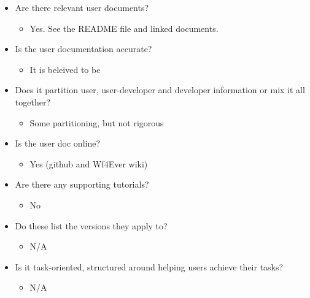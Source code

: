 \begin{itemize}
\itemsep1pt\parskip0pt
\item
  Are there relevant user documents?

  \begin{itemize}
  \itemsep1pt\parskip0pt
  \item
    Yes. See the README file and linked documents.
  \end{itemize}
\item
  Is the user documentation accurate?

  \begin{itemize}
  \itemsep1pt\parskip0pt
  \item
    It is beleived to be
  \end{itemize}
\item
  Does it partition user, user-developer and developer information or
  mix it all together?

  \begin{itemize}
  \itemsep1pt\parskip0pt
  \item
    Some partitioning, but not rigorous
  \end{itemize}
\item
  Is the user doc online?

  \begin{itemize}
  \itemsep1pt\parskip0pt
  \item
    Yes (github and Wf4Ever wiki)
  \end{itemize}
\item
  Are there any supporting tutorials?

  \begin{itemize}
  \itemsep1pt\parskip0pt
  \item
    No
  \end{itemize}
\item
  Do these list the versions they apply to?

  \begin{itemize}
  \itemsep1pt\parskip0pt
  \item
    N/A
  \end{itemize}
\item
  Is it task-oriented, structured around helping users achieve their
  tasks?

  \begin{itemize}
  \itemsep1pt\parskip0pt
  \item
    N/A
  \end{itemize}
\end{itemize}

